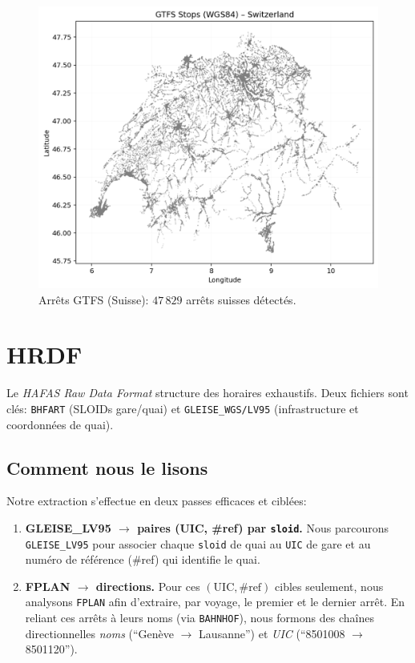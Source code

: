 \begin{figure}[h]
  \centering
  \includegraphics[width=.76\linewidth]{figures/plots/gtfs_points_switzerland.png}
  \caption[Arrêts GTFS (Suisse)]{Arrêts GTFS (Suisse): \(47\,829\) arrêts suisses détectés.}
  \label{fig:gtfs_ch_points}
\end{figure}




\vspace{.2em}

\section{HRDF}
Le \textit{HAFAS Raw Data Format} structure des horaires exhaustifs. Deux fichiers sont clés: \texttt{BHFART} (SLOIDs gare/quai) et \texttt{GLEISE\_WGS/LV95} (infrastructure et coordonnées de quai).

\subsection{Comment nous le lisons}
Notre extraction s’effectue en deux passes efficaces et ciblées:
\begin{enumerate}
  \item \textbf{GLEISE\_LV95 \(\to\) paires (UIC, \#ref) par \texttt{sloid}.} Nous parcourons \texttt{GLEISE\_LV95} pour associer chaque \texttt{sloid} de quai au \texttt{UIC} de gare et au numéro de référence (\#ref) qui identifie le quai.
  \item \textbf{FPLAN \(\to\) directions.} Pour ces \((\text{UIC}, \#\text{ref})\) cibles seulement, nous analysons \texttt{FPLAN} afin d’extraire, par voyage, le premier et le dernier arrêt. En reliant ces arrêts à leurs noms (via \texttt{BAHNHOF}), nous formons des chaînes directionnelles \textit{noms} (\enquote{Genève \(\to\) Lausanne}) et \textit{UIC} (\enquote{8501008 \(\to\) 8501120}).
\end{enumerate}

